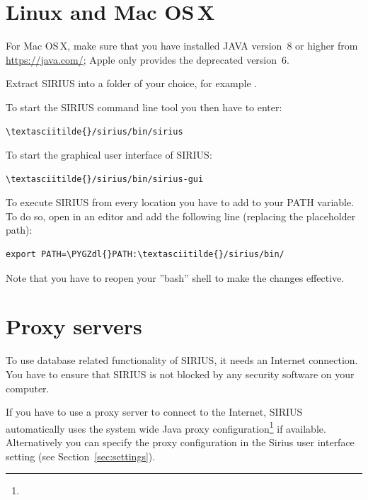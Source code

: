 \documentclass[letterpaper,10pt,openany,oneside]{sphinxmanual}
\def\PYGZdl{\char`\$}
\begin{document}

\section{Linux and Mac OS\,X}
\label{install:linux-and-macosx}

For Mac OS\,X, make sure that you have installed JAVA version~8 or higher
from \url{https://java.com/}; Apple only provides the deprecated version~6.

Extract SIRIUS into a folder of your choice, for example .

To start the SIRIUS command line tool you then have to enter:
\begin{Verbatim}[commandchars=\\\{\}]
\textasciitilde{}/sirius/bin/sirius
\end{Verbatim}

To start the graphical user interface of SIRIUS:
\begin{Verbatim}[commandchars=\\\{\}]
\textasciitilde{}/sirius/bin/sirius-gui
\end{Verbatim}

To execute SIRIUS from every location you have to add 
to your PATH variable. To do so, open  in an 
editor and add the following line (replacing the placeholder path):
\begin{Verbatim}[commandchars=\\\{\}]
export PATH=\PYGZdl{}PATH:\textasciitilde{}/sirius/bin/
\end{Verbatim}
Note that you have to reopen your ''bash'' shell to make the changes effective.



\section{Proxy servers}
\label{install:proxy}
To use database related functionality of SIRIUS, it needs an 
Internet connection. You have to ensure that SIRIUS is not blocked by any 
security software on your computer.

If you have to use a proxy server to connect to the Internet, SIRIUS 
automatically uses the system wide Java proxy 
configuration\footnote{}
if available. Alternatively you can specify the proxy configuration in the 
Sirius user interface setting (see Section~\ref{sec:settings}). 
\end{document}
